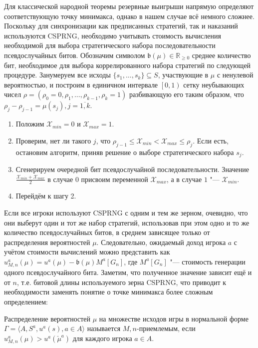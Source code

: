 Для классической народной теоремы резервные выигрыши напрямую определяют соответствующую точку минимакса, однако в нашем случае всё немного сложнее. Поскольку для синхронизации как предписанных стратегий, так и наказаний используются CSPRNG, необходимо учитывать стоимость вычисления необходимой для выбора стратегического набора последовательности псевдослучайных битов. Обозначим символом $\mathfrak{b}(\mu) \in \mathbb{R}_{\ge 0}$ среднее количество бит, необходимое для выбора коррелированного набора стратегий по следующей процедуре. Занумеруем все исходы $\{s_1, \ldots, s_k\} \subseteq S$, участвующие в $\mu$ с ненулевой вероятностью, и построим в единичном интервале $\left[0, 1\right)$ сетку неубывающих чисел $\rho = (\rho_0 = 0, \rho_1, \ldots, \rho_{k - 1}, \rho_k = 1)$ разбивающую его таким образом, что $\rho_j - \rho_{j-1} = \mu(s_j), j = \overline{1,k}$.

\begin{enumerate}
	\item Положим $\mathcal{X}_{min} = 0$ и $\mathcal{X}_{max} = 1$.
	\item Проверим, нет ли такого $j$, что $\rho_{j-1} \le \mathcal{X}_{min} < \mathcal{X}_{max} \le \rho_j$. Если есть, остановим алгоритм, приняв решение о выборе стратегического набора $s_j$.
	\item Сгенерируем очередной бит псевдослучайной последовательности. Значение $\frac{\mathcal{X}_{min} + \mathcal{X}_{max}}{2}$ в случае $0$ присвоим переменной $\mathcal{X}_{max}$, а в случае $1$ "--- $\mathcal{X}_{min}$.
	\item Перейдём к шагу 2.
\end{enumerate}

Если все игроки используют CSPRNG с одним и тем же зерном, очевидно, что они выберут один и тот же набор стратегий, использовав при этом одно и то же количество псевдослучайных битов, в среднем зависящее только от распределения вероятностей $\mu$. Следовательно, ожидаемый доход игрока $a$ с учётом стоимости вычислений можно представить как $u_{M,n}^a(\mu) = u^a(\mu) - \mathfrak{b}(\mu) M^a[G_n]$, где $M^a[G_n]$ "--- стоимость генерации одного псевдослучайного бита. Заметим, что полученное значение зависит ещё и от $n$, т.е. битовой длины используемого зерна CSPRNG, что приводит к необходимости заменять понятие о точке минимакса более сложным определением:

\begin{definition}
	Распределение вероятностей $\mu$ на множестве исходов игры в нормальной форме $\Gamma = \langle A, S^a, u^a(s), a \in A \rangle$ называется $M,n$-приемлемым, если $u_{M,n}^a(\mu) > u^a(\check{\mu}^a)$ для каждого игрока $a \in A$. %
\end{definition}

